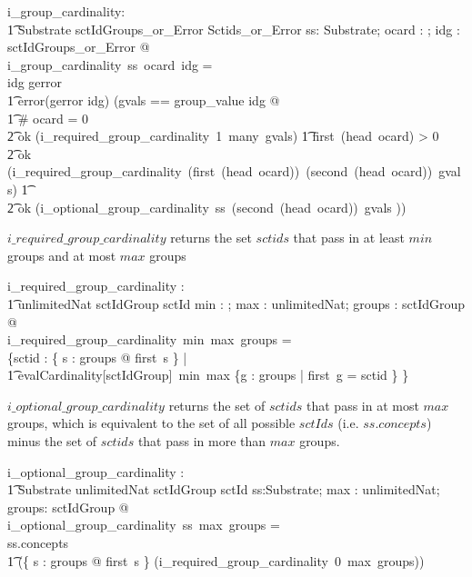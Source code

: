\documentclass{article}
\begin{document}
\begin{gendef}
   i\_group\_cardinality: \\
\t1 Substrate \fun \optional[cardinality] \fun sctIdGroups\_or\_Error \fun Sctids\_or\_Error
\where
   \forall ss: Substrate; ocard : \optional[cardinality]; idg : sctIdGroups\_or\_Error @ \\
   i\_group\_cardinality~ss~ocard~idg = \\
   \IF idg \in \ran gerror \THEN \\
   \t1 error(gerror \inv idg)
\also
\ELSE (\LET gvals == group\_value \inv idg @ \\
\t1 \IF \# ocard = 0 \THEN \\
\t2 ok (i\_required\_group\_cardinality~1~many~gvals)
\also
\t1 \ELSE \IF first~(head~ocard) > 0 \THEN \\
\t2  ok (i\_required\_group\_cardinality~(first~(head~ocard))~(second~(head~ocard))~gvals)
\also
\t1 \ELSE \\
\t2 ok (i\_optional\_group\_cardinality~ss~(second~(head~ocard))~gvals ))
\end{gendef}


$i\_required\_group\_cardinality$ returns the set  $sctids$ that pass in at least $min$ groups and at most $max$ groups
\begin{gendef}
   i\_required\_group\_cardinality : \\
\t1 \nat \fun unlimitedNat \fun \power sctIdGroup \fun \power sctId
\where
   \forall min : \nat; max : unlimitedNat; groups : \power sctIdGroup  @ \\
i\_required\_group\_cardinality~min~max~groups = \\
\{sctid :  \{ s : groups @ first~s \} | \\
\t1 evalCardinality[sctIdGroup]~min~max \{g : groups | first~g = sctid \} \neq \emptyset \}
\end{gendef}

$i\_optional\_group\_cardinality$ returns the set of $sctids$ that pass in at most $max$ groups, which is equivalent to the
set of all possible $sctIds$ (i.e. $ss.concepts$) minus the set of $sctids$ that pass in more than $max$ groups.

\begin{gendef}
   i\_optional\_group\_cardinality : \\
\t1 Substrate \fun unlimitedNat \fun \power sctIdGroup  \fun \power sctId
\where
   \forall ss:Substrate; max : unlimitedNat; groups: \power sctIdGroup  @ \\
i\_optional\_group\_cardinality~ss~max~groups = \\
ss.concepts \setminus \\
\t1 (\{ s : groups @ first~s \} \setminus (i\_required\_group\_cardinality~0~max~groups)) 
\end{gendef}
\end{document}
